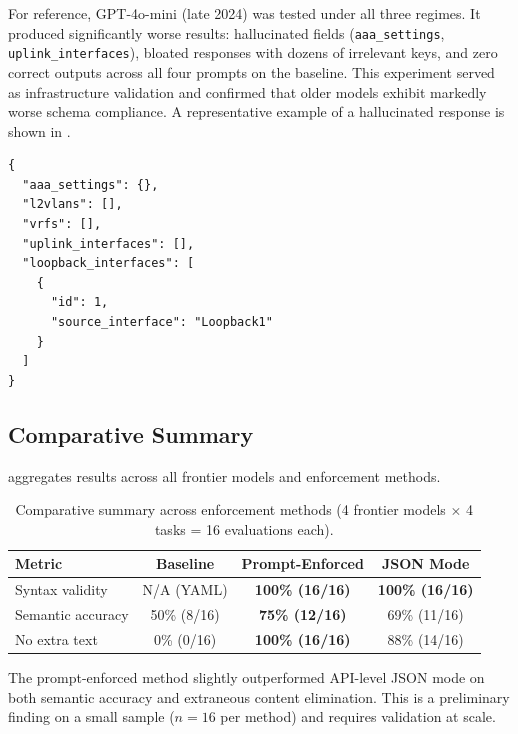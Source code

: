 \documentclass[11pt, letterpaper]{article}
\begin{document}
For reference, GPT-4o-mini (late 2024) was tested under all three regimes. It produced significantly worse results: hallucinated fields (\texttt{aaa\_settings}, \texttt{uplink\_interfaces}), bloated responses with dozens of irrelevant keys, and zero correct outputs across all four prompts on the baseline. This experiment served as infrastructure validation and confirmed that older models exhibit markedly worse schema compliance. A representative example of a hallucinated response is shown in .

\begin{lstlisting}[caption={GPT-4o-mini JSON-mode response to Prompt~2 (VXLAN source interface). The model hallucinated \texttt{loopback\_interfaces} and \texttt{source\_interface}---neither exists in the AVD schema.}, label={lst:gpt4omini_example}, language={}, basicstyle=\ttfamily\footnotesize]
{
  "aaa_settings": {},
  "l2vlans": [],
  "vrfs": [],
  "uplink_interfaces": [],
  "loopback_interfaces": [
    {
      "id": 1,
      "source_interface": "Loopback1"
    }
  ]
}
\end{lstlisting}

\subsection{Comparative Summary}
\label{sec:summary}

 aggregates results across all frontier models and enforcement methods.

\begin{table}[H]
\centering
\caption{Comparative summary across enforcement methods (4 frontier models $\times$ 4 tasks = 16 evaluations each).}
\label{tab:comparative}
\begin{tabular}{lccc}
\toprule
\textbf{Metric} & \textbf{Baseline} & \textbf{Prompt-Enforced} & \textbf{JSON Mode} \\
\midrule
Syntax validity    & N/A (YAML)  & \textbf{100\% (16/16)} & \textbf{100\% (16/16)} \\
Semantic accuracy  & 50\% (8/16) & \textbf{75\% (12/16)}  & 69\% (11/16) \\
No extra text      & 0\% (0/16)  & \textbf{100\% (16/16)} & 88\% (14/16) \\
\bottomrule
\end{tabular}
\end{table}

\noindent The prompt-enforced method slightly outperformed API-level JSON mode on both semantic accuracy and extraneous content elimination. This is a preliminary finding on a small sample ($n=16$ per method) and requires validation at scale.
\end{document}
